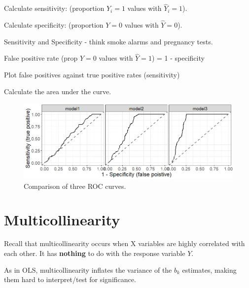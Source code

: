 \documentclass[12pt]{notes}
\begin{document}
\item Calculate sensitivity: (proportion $Y_i=1$ values with $\hat{Y}_i = 1$).
\item Calculate specificity: (proportion $Y = 0$ values with $\hat{Y} = 0$). 
\bi
\item Sensitivity and Specificity - think smoke alarms and pregnancy tests. 
\ei
\item False positive rate (prop $Y=0$ values with $\hat{Y} = 1$) = 1 - specificity
\item Plot false positives against true positive rates (sensitivity)
\item Calculate the area under the curve. 
\ei
\ei
\ei



\begin{figure}[H]
\centering
\includegraphics[width = \textwidth]{figures/module5/roc_curves.png}
\caption{Comparison of three ROC curves.}
\label{fig:ROC}
\end{figure}


\begin{minipage}[l][2cm][c]{\textwidth}

\end{minipage}

 
\section{Multicollinearity}
Recall that multicollinearity occurs when X variables are highly correlated with each other. It has \textbf{nothing} to do with the response variable $Y.$

\nspace
As in OLS, multicollinearity inflates the variance of the $b_k$ estimates, making them hard to interpret/test for significance.
\end{document}

